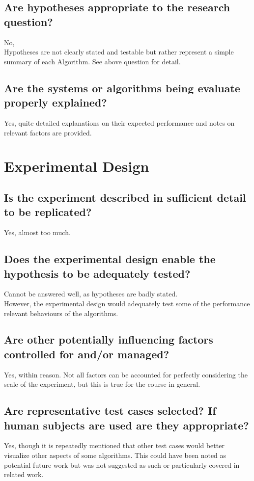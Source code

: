 \documentclass{article}
\begin{document}
      \subsection{ Are hypotheses appropriate to the research question?}
        No,
        \\
        Hypotheses are not clearly stated and testable but rather represent a simple summary of each Algorithm. See above question for detail.
      \subsection{ Are the systems or algorithms being evaluate properly explained?}
        Yes, quite detailed explanations on their expected performance and notes on relevant factors are provided.
         
    \section{Experimental Design}
      \subsection{ Is the experiment described in sufficient detail to be replicated?}
        Yes, almost too much.
      \subsection{ Does the experimental design enable the hypothesis to be adequately tested?}
        Cannot be answered well, as hypotheses are badly stated.
        \\
        However, the experimental design would adequately test some of the performance relevant behaviours of the algorithms.
      \subsection{ Are other potentially influencing factors controlled for and/or managed?}
        Yes, within reason. Not all factors can be accounted for perfectly considering the scale of the experiment, but this is true for the course in general.
      \subsection{ Are representative test cases selected? If human subjects are used are they appropriate?}
        Yes, though it is repeatedly mentioned that other test cases would better visualize other aspects of some algorithms. This could have been noted as potential future work but was not suggested as such or particularly covered in related work.
\end{document}
